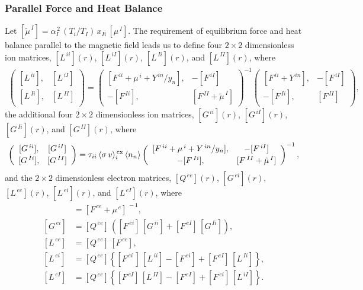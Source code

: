 \documentclass[12pt,prb,aps]{revtex4-1}
\begin{document}
\subsubsection{Parallel Force and Heat Balance}\label{sbalance}
Let
$[\tilde{\mu}^{\,I}] =\alpha_I^{\,2}\,(T_i/T_I)\,x_{Ii}\,[\mu^{\,I}]$.
The requirement of equilibrium force and heat balance parallel to the magnetic field leads us to define
four $2\times 2$  dimensionless ion matrices, $[L^{\,ii}](r)$, $[L^{\,iI}](r)$, $[L^{\,Ii}](r)$, and $[L^{\,II}](r)$,
where
\begin{align}
\left(\begin{array}{cc} [L^{\,ii}], & [L^{\,iI}]\\[0.5ex] [L^{\,Ii}],& [L^{\,II}]\end{array}\right)=
\left(\begin{array}{cc}[F^{\,ii}+\mu^{\,i}+ Y^{\,in}/y_n], & -[F^{\,iI}]\\[0.5ex] -[F^{\,Ii}], & [F^{\,II}+\tilde{\mu}^{\,I}]\end{array}\right)^{-1}
\left(\begin{array}{cc} [F^{\,ii}+Y^{\,in}], & -[F^{\,iI}]\\[0.5ex] -[F^{\,Ii}], & [F^{\,II}]\end{array}\right),
\end{align}
the additional  four $2\times 2$  dimensionless ion matrices, $[G^{\,ii}](r)$, $[G^{\,iI}](r)$, $[G^{\,Ii}](r)$, and $[G^{\,II}](r)$,
where
\begin{align}
\left(\begin{array}{cc} [G^{\,ii}], & [G^{\,iI}]\\[0.5ex] [G^{\,Ii}],& [G^{\,II}]\end{array}\right)=\tau_{ii}\,\langle \sigma\,v\rangle_i^{\,\rm cx}
\,\langle n_n\rangle
\left(\begin{array}{cc}[F^{\,ii}+\mu^{\,i}+ Y^{\,in}/y_n], & -[F^{\,iI}]\\[0.5ex] -[F^{\,Ii}], & [F^{\,II}+\tilde{\mu}^{\,I}]\end{array}\right)^{-1},
\end{align}
and the $2\times 2$ dimensionless electron matrices, $[Q^{\,ee}](r)$, $[G^{\,ei}](r)$, $[L^{\,ee}](r)$, $[L^{\,ei}](r)$, 
and $[L^{\,eI}](r)$, 
where
\begin{align}
[Q^{\,ee}]&= [F^{\,ee}+\mu^{\,e}]^{\,-1},\\[0.5ex]
[G^{\,ei}] &= [Q^{\,ee}]\,([F^{\,ei}]\,[G^{\,ii}]+ [F^{\,eI}]\,[G^{\,Ii}]),\\[0.5ex]
[L^{\,ee}] &= [Q^{\,ee}]\,[F^{\,ee}],\\[0.5ex]
[L^{\,ei}] &= [Q^{\,ee}]\left\{[F^{\,ei}\,]\,[L^{\,ii}]-[F^{\,ei}]+[F^{\,eI}]\,[L^{\,Ii}]\right\},\\[0.5ex]
[L^{\,eI}] &= [Q^{\,ee}]\left\{[F^{\,eI}]\,[L^{\,II}]-[F^{\,eI}]+[F^{\,ei}]\,[L^{\,iI}]\right\}.
\end{align}
\end{document}
